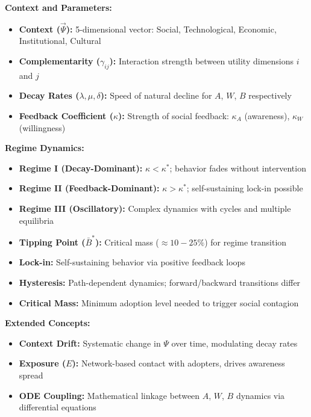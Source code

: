 \textbf{Context and Parameters:}
\begin{itemize}[nosep]
    \item \textbf{Context ($\vec{\Psi}$):} 5-dimensional vector: Social, Technological, Economic, Institutional, Cultural
    \item \textbf{Complementarity ($\gamma_{ij}$):} Interaction strength between utility dimensions $i$ and $j$
    \item \textbf{Decay Rates ($\lambda, \mu, \delta$):} Speed of natural decline for $A$, $W$, $B$ respectively
    \item \textbf{Feedback Coefficient ($\kappa$):} Strength of social feedback: $\kappa_A$ (awareness), $\kappa_W$ (willingness)
\end{itemize}

\textbf{Regime Dynamics:}
\begin{itemize}[nosep]
    \item \textbf{Regime I (Decay-Dominant):} $\kappa < \kappa^*$; behavior fades without intervention
    \item \textbf{Regime II (Feedback-Dominant):} $\kappa > \kappa^*$; self-sustaining lock-in possible
    \item \textbf{Regime III (Oscillatory):} Complex dynamics with cycles and multiple equilibria
    \item \textbf{Tipping Point ($\bar{B}^*$):} Critical mass ($\approx 10-25\%$) for regime transition
    \item \textbf{Lock-in:} Self-sustaining behavior via positive feedback loops
    \item \textbf{Hysteresis:} Path-dependent dynamics; forward/backward transitions differ
    \item \textbf{Critical Mass:} Minimum adoption level needed to trigger social contagion
\end{itemize}

\textbf{Extended Concepts:}
\begin{itemize}[nosep]
    \item \textbf{Context Drift:} Systematic change in $\Psi$ over time, modulating decay rates
    \item \textbf{Exposure ($E$):} Network-based contact with adopters, drives awareness spread
    \item \textbf{ODE Coupling:} Mathematical linkage between $A$, $W$, $B$ dynamics via differential equations
\end{itemize}

